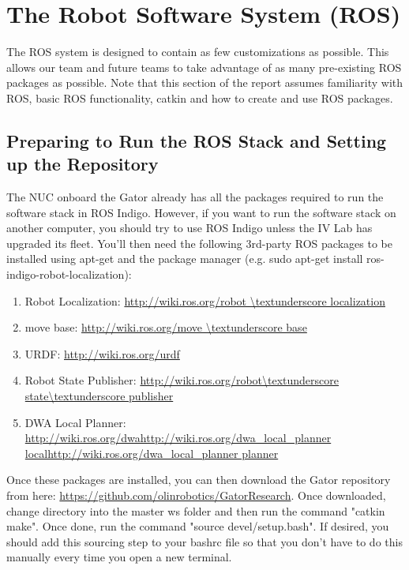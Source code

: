 \chapter{The Robot Software System (ROS)}

The ROS system is designed to contain as few customizations as possible. This allows our team and future teams to take advantage of as many pre-existing ROS packages as possible. Note that this section of the report assumes familiarity with ROS, basic ROS functionality, catkin and how to create and use ROS packages.

\section{Preparing to Run the ROS Stack and Setting up the Repository}

The NUC onboard the Gator already has all the packages required to run the software stack in ROS Indigo. However, if you want to run the software stack on another computer, you should try to use ROS Indigo unless the IV Lab has upgraded its fleet. You'll then need the following 3rd-party ROS packages to be installed using apt-get and the package manager (e.g. sudo apt-get install ros-indigo-robot-localization):

\begin{enumerate}
\item Robot Localization: \url{http://wiki.ros.org/robot \textunderscore localization}
\item move base: \url{http://wiki.ros.org/move \textunderscore base}
\item URDF: \url{http://wiki.ros.org/urdf}
\item Robot State Publisher: \url{http://wiki.ros.org/robot\textunderscore state\textunderscore publisher}
\item DWA Local Planner: \url{http://wiki.ros.org/dwahttp://wiki.ros.org/dwa_local_planner localhttp://wiki.ros.org/dwa_local_planner planner}
\end{enumerate}

\noindent Once these packages are installed, you can then download the Gator repository from here: \url{https://github.com/olinrobotics/GatorResearch}. Once downloaded, change directory into the master \textunderscore ws folder and then run the command "catkin \textunderscore make". Once done, run the command "source devel/setup.bash". If desired, you should add this sourcing step to your bashrc file so that you don't have to do this manually every time you open a new terminal.

